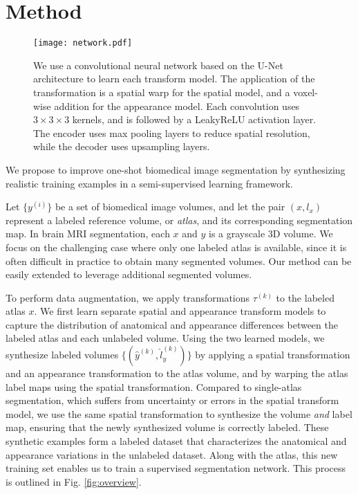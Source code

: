 \documentclass[10pt,twocolumn,letterpaper]{article}
\begin{document}
%
 \section{Method}
\begin{figure*}[t]
    \centering
        \texttt{[image: network.pdf]}
    \caption{We use a convolutional neural network based on the U-Net architecture \cite{ronneberger2015u} to learn each transform model. The application of the transformation is a spatial warp for the spatial model, and a voxel-wise addition for the appearance model. Each convolution uses $3\times3\times3$ kernels, and is followed by a LeakyReLU activation layer. The encoder uses max pooling layers to reduce spatial resolution, while the decoder uses upsampling layers. }\label{fig:network}
\end{figure*}

We propose to improve one-shot biomedical image segmentation by synthesizing realistic training examples in a semi-supervised learning framework. 


Let $\{y^{(i)}\}$ be a set of biomedical image volumes, and let the pair $(x, l_x)$ represent a labeled reference volume, or \textit{atlas}, and its corresponding segmentation map. In brain MRI segmentation, each $x$ and $y$ is a grayscale 3D volume. We focus on the challenging case where only one labeled atlas is available, since it is often difficult in practice to obtain many segmented volumes. Our method can be easily extended to leverage additional segmented volumes. 

To perform data augmentation, we apply transformations $\tau^{(k)}$ to the labeled atlas $x$. We first learn separate spatial and appearance transform models to capture the distribution of anatomical and appearance differences between the labeled atlas and each unlabeled volume. Using the two learned models, we synthesize labeled volumes $\{(\hat y^{(k)}, \hat l_y^{(k)})\}$ by applying a spatial transformation and an appearance transformation to the atlas volume, and by warping the atlas label maps using the spatial transformation. Compared to single-atlas segmentation, which suffers from uncertainty or errors in the spatial transform model, we use the same spatial transformation to synthesize the volume \textit{and} label map, ensuring that the newly synthesized volume is correctly labeled. These synthetic examples form a labeled dataset that characterizes the anatomical and appearance variations in the unlabeled dataset. Along with the atlas, this new training set enables us to train a supervised segmentation network. This process is outlined in Fig. \ref{fig:overview}. 
\end{document}
